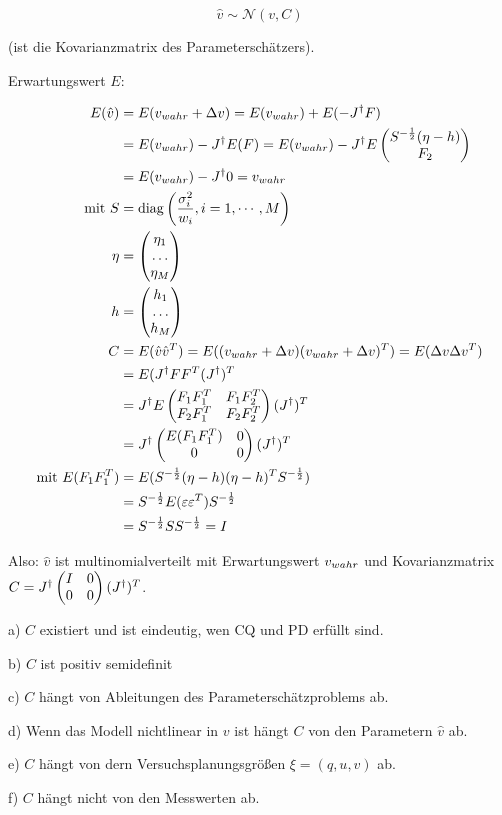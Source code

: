 \[ \hat v \sim \mathcal N(v,C) \]

(ist die Kovarianzmatrix des Parameterschätzers).

Erwartungswert $E$:

\begin{align*}
E(\hat v) &= E(v_{wahr} + \Delta v) = E(v_{wahr}) + E(-J^\dagger F) \\
&= E(v_{wahr}) - J^\dagger E(F) = E(v_{wahr}) - J^\dagger E \begin{pmatrix} S^{-\frac 12} (\eta-h) \\ F_2 \end{pmatrix} \\
&= E(v_{wahr}) - J^\dagger 0 = v_{wahr} \\
\text{mit } S &= \mathrm{diag} \left( \frac{\sigma_i^2}{w_i}, i=1,\cdots,M \right) \\
\eta &= \begin{pmatrix} \eta_1 \\ \hdots \\ \eta_M \end{pmatrix} \\
h &= \begin{pmatrix} h_1 \\ \hdots \\ h_M \end{pmatrix} \\
C &= E(\hat v \hat v^T) = E( (v_{wahr} + \Delta v) (v_{wahr} + \Delta v)^T ) = E(\Delta v \Delta v^T) \\
&= E(J^\dagger F F^T (J^\dagger)^T \\
&= J^\dagger E \begin{pmatrix} F_1 F_1^T & F_1 F_2^T \\ F_2 F_1^T & F_2 F_2^T \end{pmatrix} (J^\dagger)^T \\
&= J^\dagger \begin{pmatrix} E(F_1 F_1^T) & 0 \\ 0 & 0 \end{pmatrix} (J^\dagger)^T \\
\text{mit } E(F_1 F_1^T) &= E( S^{-\frac 12} (\eta-h)(\eta-h)^T S^{-\frac 12}) \\
&= S^{-\frac 12} E(\varepsilon \varepsilon^T) S^{-\frac 12 } \\
&= S^{-\frac 12} S S^{-\frac 12} = I \\
\end{align*}

Also: $\hat v$ ist multinomialverteilt mit Erwartungswert $v_{wahr}$ und Kovarianzmatrix $C = J^\dagger \begin{pmatrix} I & 0 \\ 0 & 0 \end{pmatrix} (J^\dagger)^T$.


\bitm
\item a) $C$ existiert und ist eindeutig, wen CQ und PD erfüllt sind.
\item b) $C$ ist positiv semidefinit
\item c) $C$ hängt von Ableitungen des Parameterschätzproblems ab.
\item d) Wenn das Modell nichtlinear in $v$ ist hängt $C$ von den Parametern $\hat v$ ab.
\item e) $C$ hängt von dern Versuchsplanungsgrößen $\xi = (q,u,v)$ ab.
\item f) $C$ hängt nicht von den Messwerten ab.
\eitm













